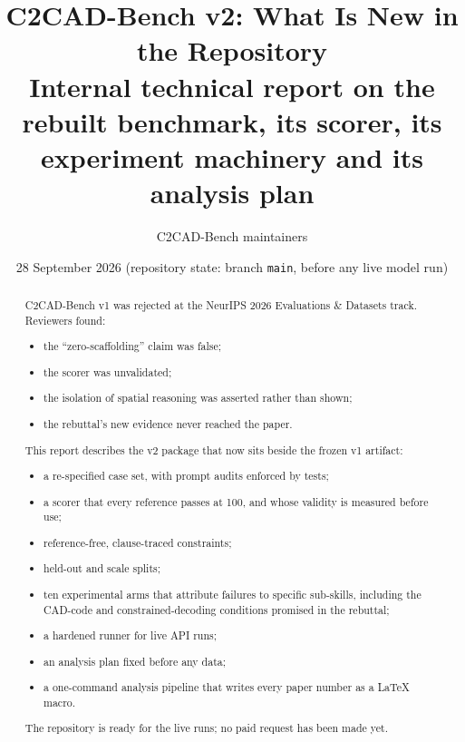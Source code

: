 \documentclass[10pt,a4paper]{article}
\title{C2CAD-Bench v2: What Is New in the Repository\\[2pt]
\large Internal technical report on the rebuilt benchmark, its scorer, its experiment machinery and its analysis plan}
\author{C2CAD-Bench maintainers}
\date{28 September 2026 \quad(repository state: branch \texttt{main}, before any live model run)}
\begin{document}
\maketitle

\begin{abstract}
\noindent C2CAD-Bench v1 was rejected at the NeurIPS 2026 Evaluations \& Datasets track. Reviewers found:
\begin{itemize}
\item the ``zero-scaffolding'' claim was false;
\item the scorer was unvalidated;
\item the isolation of spatial reasoning was asserted rather than shown;
\item the rebuttal's new evidence never reached the paper.
\end{itemize}
This report describes the v2 package that now sits beside the frozen v1 artifact:
\begin{itemize}
\item a re-specified case set, with prompt audits enforced by tests;
\item a scorer that every reference passes at 100, and whose validity is measured before use;
\item reference-free, clause-traced constraints;
\item held-out and scale splits;
\item ten experimental arms that attribute failures to specific sub-skills, including the CAD-code and constrained-decoding conditions promised in the rebuttal;
\item a hardened runner for live API runs;
\item an analysis plan fixed before any data;
\item a one-command analysis pipeline that writes every paper number as a \LaTeX{} macro.
\end{itemize}
The repository is ready for the live runs; no paid request has been made yet.
\end{abstract}

\tableofcontents
\bigskip

\end{document}
